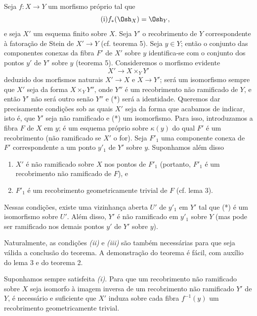 Seja $f:X\longrightarrow Y$ um morfismo próprio tal que
\begin{equation}
  \tag{i}
  f_*(\Osh_X)=\Osh_Y,
\end{equation}
e seja $X'$ um esquema finito sobre $X$. Seja $Y'$ o recobrimento de $Y$
correspondente à fatoração de Stein de $X'\longrightarrow Y$
(cf. teorema 5). Seja $y\in Y$; então o conjunto das componentes conexas
da fibra $F'$ de $X'$ sobre $y$ identifica-se com o conjunto dos pontos
$y'$ de $Y'$ sobre $y$ (teorema 5). Consideremos o morfismo evidente
\begin{equation}
  \tag{*}
  X'\longrightarrow X\times_Y Y'
\end{equation}
deduzido dos morfismos naturais $X'\longrightarrow X$ e
$X\longrightarrow Y'$; será um isomorfismo sempre que $X'$ seja da forma
$X\times_Y Y''$, onde $Y''$ é um recobrimento não ramificado de $Y$, e
então $Y'$ não será outro senão $Y''$ e (*) será a identidade. Queremos dar
precisamente condições sob as quais $X'$ seja da forma que acabamos de
indicar, isto é, que $Y'$ seja não ramificado e (*) um isomorfismo. Para isso,
introduzamos a fibra $F$ de $X$ em $y$; é um esquema próprio sobre
$\kappa(y)$ do qual $F'$ é um recobrimento (não ramificado se $X'$ o for).
Seja $F'_1$ uma componente conexa de $F'$ correspondente a um ponto $y'_1$ de
$Y'$ sobre $y$. Suponhamos além disso
\begin{enumerate}
  \item[\textit{(ii)}] $X'$ é não ramificado sobre $X$ nos pontos de $F'_1$
    (portanto, $F'_1$ é um recobrimento não ramificado de $F$), e
  \item[\textit{(iii)}] $F'_1$ é um recobrimento geometricamente trivial de
    $F$ (cf. lema 3).
\end{enumerate}

 Nessas condições, existe uma vizinhança aberta $U'$ de
$y'_1$ em $Y'$ tal que (*) é um isomorfismo sobre $U'$. Além disso, $Y'$ é não
ramificado em $y'_1$ sobre $Y$ (mas pode ser ramificado nos demais pontos
$y'$ de $Y'$ sobre $y$).

Naturalmente, as condições \textit{(ii)} e \textit{(iii)} são também
necessárias para que seja válida a conclusão do teorema. A demonstração do
teorema é fácil, com auxílio do lema 3 e do teorema 2.

 Suponhamos sempre satisfeita \textit{(i)}. Para que um
recobrimento não ramificado sobre $X$ seja isomorfo à imagem inversa de um
recobrimento não ramificado $Y'$ de $Y$, é necessário e suficiente que $X'$
induza sobre cada fibra $f^{-1}(y)$ um recobrimento geometricamente trivial.

